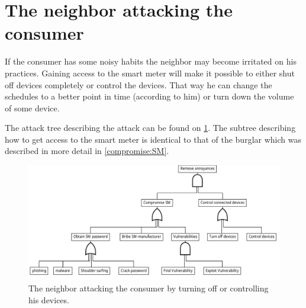 \section{The neighbor attacking the consumer}

If the consumer has some noisy habits the neighbor may become irritated on his practices.
Gaining access to the smart meter will make it possible to either shut off devices completely or control the devices.
That way he can change the schedules to a better point in time (according to him) or turn down the volume of some device.

The attack tree describing the attack can be found on \cref{fig:attack_trees:neighbor}.
The subtree describing how to get access to the smart meter is identical to that of the burglar which was described in more detail in \cref{compromise:SM}.

\begin{figure}[h]
  \centering
	\includegraphics[width=\textwidth]{figures/graphviz/neighbor_vs_consumer.pdf}
	\caption{The neighbor attacking the consumer by turning off or controlling his devices.}
	\label{fig:attack_trees:neighbor}
\end{figure}